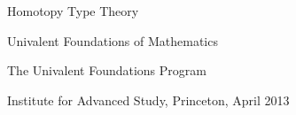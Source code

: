 \pagestyle{empty}%
%
%


\setcounter{page}{1}


\vspace*{0.2\textheight}
{\centering
{\fontsize{46}{60}\selectfont%
Homotopy Type Theory}\par
\vspace*{20pt}
{\fontsize{23}{40}\selectfont%
Univalent Foundations of Mathematics}\par
\vfill
{\fontsize{19}{25}\selectfont%
The Univalent Foundations Program\par
\vspace*{8pt}
Institute for Advanced Study,
Princeton, April 2013\par}}
\vspace{0.03\textheight}
\hbox{}

\clearpage

%
\hbox{}
\vfill

